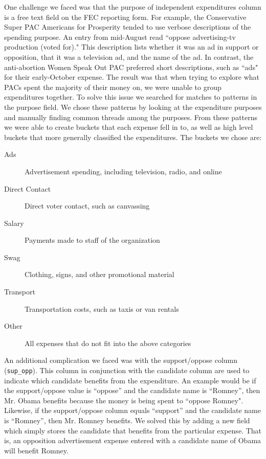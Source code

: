 \documentclass[11pt]{article}\usepackage{graphicx, color}
\begin{document}
One challenge we faced was that the purpose of independent expenditures column is a free text field on the FEC reporting form. For example, the Conservative Super PAC Americans for Prosperity tended to use verbose descriptions of the spending purpose.  An entry from mid-August read ``oppose advertising-tv production (voted for)."  This description lists whether it was an ad in support or opposition, that it was a television ad, and the name of the ad. In contrast, the anti-abortion Women Speak Out PAC preferred short descriptions, such as ``ads" for their early-October expense. The result was that when trying to explore what PACs spent the majority of their money on, we were unable to group expenditures together. To solve this issue we searched for matches to patterns in the purpose field. We chose these patterns by looking at the expenditure purposes and manually finding common threads among the purposes. From these patterns we were able to create buckets that each expense fell in to, as well as high level buckets that more generally classified the expenditures.  The buckets we chose are: 

\begin{description}
    \item[Ads] Advertisement spending, including television, radio, and online
    \item[Direct Contact] Direct voter contact, such as canvassing
    \item[Salary] Payments made to staff of the organization
    \item[Swag] Clothing, signs, and other promotional material
    \item[Transport] Transportation costs, such as taxis or van rentals
    \item[Other] All expenses that do not fit into the above categories
\end{description}

An additional complication we faced was with the support/oppose column (\texttt{sup\_opp}). This column in conjunction with the candidate column are used to indicate which candidate benefits from the expenditure. An example would be if the support/oppose value is ``oppose'' and the candidate name is ``Romney'', then Mr. Obama benefits because the money is being spent to ``oppose Romney". Likewise, if the support/oppose column equals ``support'' and the candidate name is ``Romney'', then Mr. Romney benefits.  We solved this by adding a new field which simply stores the candidate that benefits from the particular expense.  That is, an opposition advertisement expense entered with a candidate name of Obama will benefit Romney.
\end{document}
